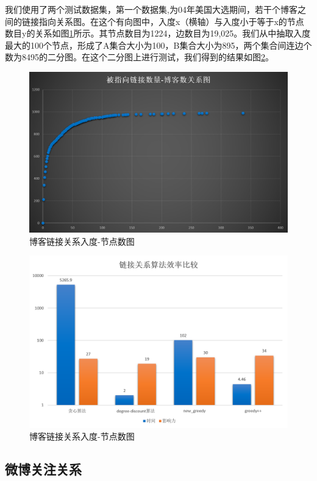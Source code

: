 \documentclass[11pt, a4paper]{article}
\begin{document}
  我们使用了两个测试数据集，第一个数据集\cite{konect:2017:moreno_blogs},\cite{konect:adamic2005}为04年美国大选期间，若干个博客之间的链接指向关系图。在这个有向图中，入度x（横轴）与入度小于等于x的节点数目y的关系如图\ref{fig:blog}所示。其节点数目为1224，边数目为19,025。我们从中抽取入度最大的100个节点，形成了A集合大小为100，B集合大小为895，两个集合间连边个数为8495的二分图。在这个二分图上进行测试，我们得到的结果如图\ref{fig:blog_res}。

  \begin{figure}[H]
    \centering
    \includegraphics[width=5in]{images/blog.png}
    \caption{博客链接关系入度-节点数图}\label{fig:blog}
  \end{figure}

  \begin{figure}[H]
    \centering
    \includegraphics[width=5in]{images/blog_res.png}
    \caption{博客链接关系入度-节点数图}\label{fig:blog_res}
  \end{figure}

  \subsection{微博关注关系}
\end{document}
